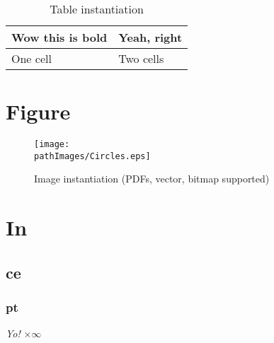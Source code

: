 \begin{table}[H] %
\begin{center}
\begin{tabular}{|p{5cm}|p{9cm}|}
\hline
\textbf{Wow this is bold} & \textbf{Yeah, right}\\
\hline
One cell & Two cells\\
\hline
\end{tabular}
\end{center}
\caption{Table instantiation}
\end{table}

\section{Figure}

\begin{figure}[H]
\centering
\texttt{[image: \\pathImages/Circles.eps]}
\caption{Image instantiation (PDFs, vector, bitmap supported) }
\end{figure}


\section{In}
\subsection{ce}
\subsubsection{pt}
\label{sssec:anion}

\newcommand{\yo} {
	\begin{flushright}
	\textit{Yo!} \begin{math}\times  \infty \end{math}
	\end{flushright}
}
\yo

%
